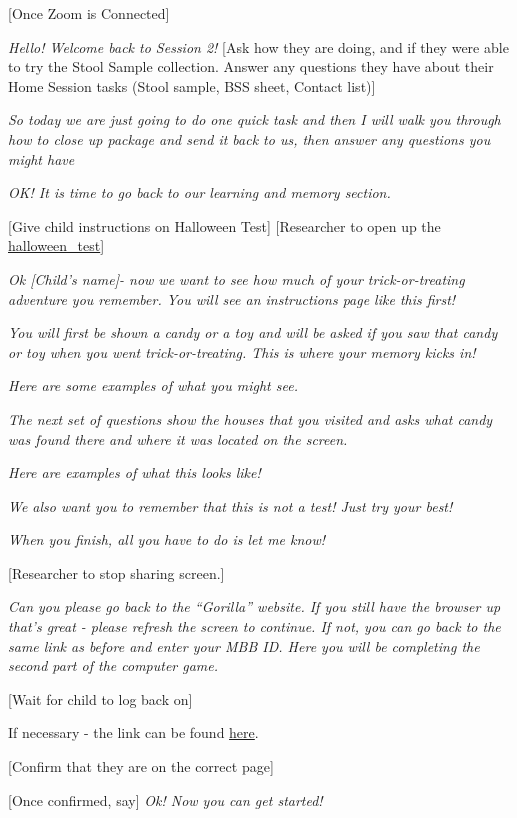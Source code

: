 \documentclass[]{book}
\begin{document}
{[}Once Zoom is Connected{]}

\emph{Hello! Welcome back to Session 2!} {[}Ask how they are doing, and if they were able to try the Stool Sample collection. Answer any questions they have about their Home Session tasks (Stool sample, BSS sheet, Contact list){]}

\emph{So today we are just going to do one quick task and then I will walk you through how to close up package and send it back to us, then answer any questions you might have}

\emph{OK! It is time to go back to our learning and memory section.}

{[}Give child instructions on Halloween Test{]} {[}Researcher to open up the \href{https://ucla.app.box.com/file/709479264913}{halloween\_test}{]}

\emph{Ok {[}Child's name{]}- now we want to see how much of your trick-or-treating adventure you remember. You will see an instructions page like this first!}

\emph{You will first be shown a candy or a toy and will be asked if you saw that candy or toy when you went trick-or-treating. This is where your memory kicks in!}

\emph{Here are some examples of what you might see.}

\emph{The next set of questions show the houses that you visited and asks what candy was found there and where it was located on the screen.}

\emph{Here are examples of what this looks like!}

\emph{We also want you to remember that this is not a test! Just try your best!}

\emph{When you finish, all you have to do is let me know!}

{[}Researcher to stop sharing screen.{]}

\emph{Can you please go back to the ``Gorilla'' website. If you still have the browser up that's great - please refresh the screen to continue. If not, you can go back to the same link as before and enter your MBB ID. Here you will be completing the second part of the computer game.}

{[}Wait for child to log back on{]}

If necessary - the link can be found \href{https://research.sc/participant/login/20451/publicid}{here}.

{[}Confirm that they are on the correct page{]}

{[}Once confirmed, say{]} \emph{Ok! Now you can get started!}
\end{document}
